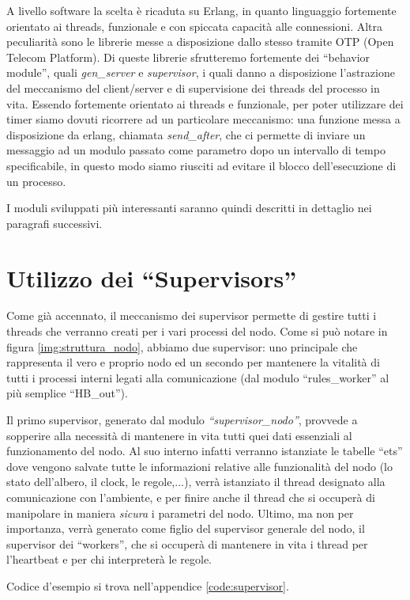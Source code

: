 \documentclass[italian]{memoir}
\begin{document}
A livello software la scelta è ricaduta su Erlang, in quanto linguaggio fortemente orientato ai threads, funzionale e con spiccata capacità alle connessioni. Altra peculiarità sono le librerie messe a disposizione dallo stesso tramite OTP (Open Telecom Platform). Di queste librerie sfrutteremo fortemente dei ``behavior module'', quali \textit{gen\_server} e \textit{supervisor}, i quali danno a disposizione l'astrazione del meccanismo del client/server e di supervisione dei threads del processo in vita. Essendo fortemente orientato ai threads e funzionale, per poter utilizzare dei timer siamo dovuti ricorrere ad un particolare meccanismo: una funzione messa a disposizione da erlang, chiamata \textit{send\_after}, che ci permette di inviare un messaggio ad un modulo passato come parametro dopo un intervallo di tempo specificabile, in questo modo siamo riusciti ad evitare il blocco dell'esecuzione di un processo.

I moduli sviluppati più interessanti saranno quindi descritti in dettaglio nei paragrafi successivi.

\section{Utilizzo dei ``Supervisors''}
Come già accennato, il meccanismo dei supervisor permette di gestire tutti i threads che verranno creati per i vari processi del nodo. Come si può notare in figura \ref{img:struttura_nodo}, abbiamo due supervisor: uno principale che rappresenta il vero e proprio nodo ed un secondo per mantenere la vitalità di tutti i processi interni legati alla comunicazione (dal modulo ``rules\_worker'' al più semplice ``HB\_out'').

Il primo supervisor, generato dal modulo \textit{``supervisor\_nodo''}, provvede a sopperire alla necessità di mantenere in vita tutti quei dati essenziali al funzionamento del nodo. Al suo interno infatti verranno istanziate le tabelle ``ets'' dove vengono salvate tutte le informazioni relative alle funzionalità del nodo (lo stato dell'albero, il clock, le regole,...), verrà istanziato il thread designato alla comunicazione con l'ambiente, e per finire anche il thread che si occuperà di manipolare in maniera \textit{sicura} i parametri del nodo. Ultimo, ma non per importanza, verrà generato come figlio del supervisor generale del nodo, il supervisor dei ``workers'', che si occuperà di mantenere in vita i thread per l'heartbeat e per chi interpreterà le regole.

Codice d'esempio si trova nell'appendice \ref{code:supervisor}.
\end{document}
